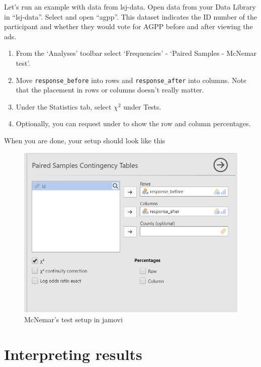 \documentclass[
]{book}
\begin{document}
Let's run an example with data from lsj-data. Open data from your Data Library in ``lsj-data''. Select and open ``agpp''. This dataset indicates the ID number of the participant and whether they would vote for AGPP before and after viewing the ads.

\begin{enumerate}
\def\labelenumi{\arabic{enumi}.}
\item
  From the `Analyses' toolbar select `Frequencies' - `Paired Samples - McNemar test'.
\item
  Move \texttt{response\_before} into rows and \texttt{response\_after} into columns. Note that the placement in rows or columns doesn't really matter.
\item
  Under the Statistics tab, select \(\chi^2\) under Tests.
\item
  Optionally, you can request under to show the row and column percentages.
\end{enumerate}

When you are done, your setup should look like this

\begin{figure}

{\centering \includegraphics[width=0.8\linewidth]{images/12-mcnemar/mcnemar_setup} 

}

\caption{McNemar's test setup in jamovi}\label{fig:unnamed-chunk-2}
\end{figure}

\hypertarget{interpreting-results-7}{%
\section{Interpreting results}\label{interpreting-results-7}}
\end{document}
